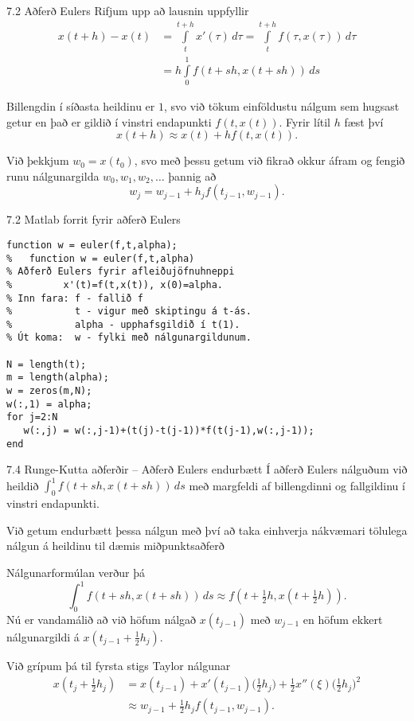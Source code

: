 \begin{frame}{7.2 Aðferð Eulers} 
Rifjum upp að lausnin uppfyllir
\begin{align*}
  x(t+h) - x(t) &= \int\limits_t^{t+h} x'(\tau) \, d\tau
  = \int\limits_t^{t+h} f(\tau,x(\tau)) \, d\tau\\
&= h\int\limits_0^{1} f(t+sh,x(t+sh)) \, ds
\end{align*}

\pause
\smallskip
Billengdin í síðasta heildinu er $1$, svo við 
tökum einföldustu nálgum sem hugsast getur 
en það er gildið í vinstri endapunkti
$f(t,x(t))$.   Fyrir lítil $h$ fæst því 
\begin{equation*}
  x(t+h) \approx x(t) + hf(t,x(t)).
\end{equation*}

\pause
\smallskip
Við þekkjum $w_0=x(t_0)$, svo með þessu getum við fikrað okkur áfram
og  fengið runu nálgunargilda $w_0, w_1, w_2, \ldots$ þannig að
\begin{equation*}
  w_j = w_{j-1} + h_{j} f(t_{j-1},w_{j-1}).
\end{equation*}
\end{frame}


\begin{frame}[fragile]{7.2 Matlab forrit fyrir aðferð Eulers} 
\begin{verbatim}
function w = euler(f,t,alpha);  
%   function w = euler(f,t,alpha) 
% Aðferð Eulers fyrir afleiðujöfnuhneppi 
%         x'(t)=f(t,x(t)), x(0)=alpha. 
% Inn fara: f - fallið f 
%           t - vigur með skiptingu á t-ás. 
%           alpha - upphafsgildið í t(1). 
% Út koma:  w - fylki með nálgunargildunum. 

N = length(t);   
m = length(alpha); 
w = zeros(m,N);  
w(:,1) = alpha; 
for j=2:N 
   w(:,j) = w(:,j-1)+(t(j)-t(j-1))*f(t(j-1),w(:,j-1));
end 
\end{verbatim}
\end{frame}


\begin{frame}{7.4 Runge-Kutta aðferðir  -- Aðferð Eulers endurbætt} 
Í aðferð Eulers nálguðum við heildið $\int_0^1 f(t+sh,x(t+sh))\, ds$
með margfeldi af billengdinni og fallgildinu í vinstri endapunkti.

\smallskip
Við getum endurbætt þessa nálgun með því að taka 
einhverja nákvæmari tölulega nálgun á heildinu til dæmis 
miðpunktsaðferð 

\pause
\smallskip
Nálgunarformúlan verður þá
$$
\int_0^1f(t+sh,x(t+sh))\, ds \approx f(t+\tfrac 12h,x(t+\tfrac 12 h)). 
$$
Nú er vandamálið að við höfum nálgað $x(t_{j-1})$ með $w_{j-1}$ en
höfum ekkert nálgunargildi á $x(t_{j-1}+\frac 12 h_j)$.  

\pause
\smallskip 
Við grípum þá til
fyrsta stigs Taylor nálgunar
\begin{align*}
x(t_j+\tfrac 12 h_j)&=x(t_{j-1})+x'(t_{j-1})\big(\tfrac 12 h_j \big)
+\tfrac 12x''(\xi)\big(\tfrac 12 h_j \big)^2\\
&\approx w_{j-1}+\tfrac 12 h_jf(t_{j-1},w_{j-1}).
\end{align*}
\end{frame}


